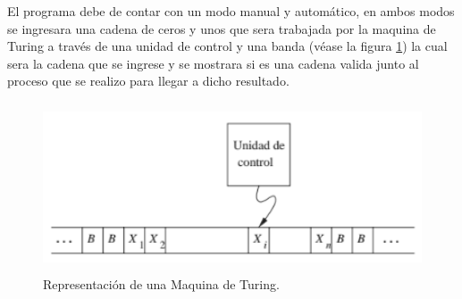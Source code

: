 	El programa debe de contar con un modo manual y automático, en ambos modos se ingresara una cadena de ceros y unos que sera trabajada por la maquina de Turing a través de una unidad de control y una banda (véase la figura \ref{fig:turing}) la cual sera la cadena que se ingrese y se mostrara si es una cadena valida junto al proceso que se realizo para llegar a dicho resultado.
	\begin{figure}[H]
		\begin{center}
		\includegraphics[width=14cm, height=5cm]{img/maquina.png}
		\caption{Representación de una Maquina de Turing. \cite{LIBRO}}
		\label{fig:turing}
		\end{center}
	\end{figure}
